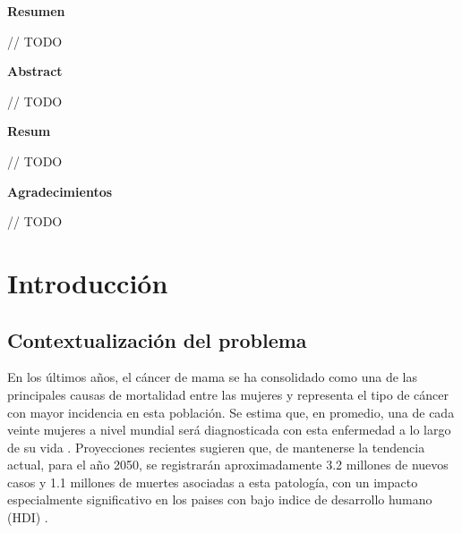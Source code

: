 \documentclass[a4paper,10pt]{book}
\begin{document}
\newpage
{}
\noindent \textbf{\large Resumen}

// TODO


\newpage
{}
\noindent \textbf{\large Abstract}

// TODO


\newpage
{}
\noindent \textbf{\large Resum}

// TODO

\newpage
{}
\noindent \textbf{\large Agradecimientos}

// TODO
 \setcounter{page}{0}
\let\cleardoublepage\clearpage
\tableofcontents
\newpage \thispagestyle{empty}

\pagestyle{fancy}
\newpage \thispagestyle{empty}
\mainmatter
\chapter{Introducción}
\section{Contextualización del problema}

En los últimos años, el cáncer de mama se ha consolidado como una de las principales causas de mortalidad entre las mujeres y representa el tipo de cáncer con mayor incidencia en esta población. Se estima que, en promedio, una de cada veinte mujeres a nivel mundial será diagnosticada con esta enfermedad a lo largo de su vida \cite{kim_global_2025}. Proyecciones recientes sugieren que, de mantenerse la tendencia actual, para el año 2050, se registrarán aproximadamente 3.2 millones de nuevos casos y 1.1 millones de muertes asociadas a esta patología, con un impacto especialmente significativo en los paises con bajo indice de desarrollo humano (HDI) \cite{kim_global_2025}.
\end{document}
